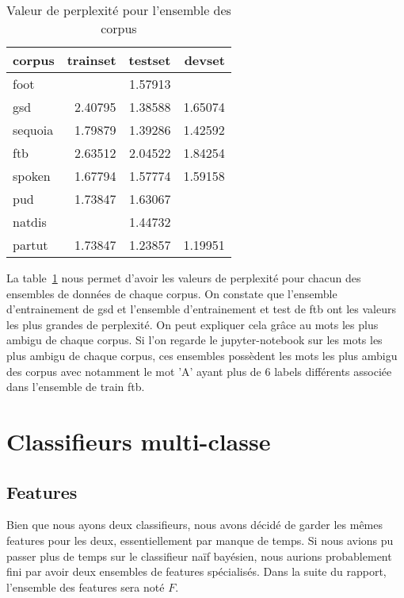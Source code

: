 \documentclass[french, 14pt]{memoir}
\begin{document}
\begin{table}
\begin{center}
\begin{tabular}{|l|r|r|r|}
\hline
corpus & trainset & testset & devset \\
\hline
 foot    &         & 1.57913 &         \\
 gsd     & 2.40795 & 1.38588 & 1.65074 \\
 sequoia & 1.79879 & 1.39286 & 1.42592 \\
 ftb     & 2.63512 & 2.04522 & 1.84254 \\
 spoken  & 1.67794 & 1.57774 & 1.59158 \\
 pud     & 1.73847 & 1.63067 &         \\
 natdis  &         & 1.44732 &         \\
 partut  & 1.73847 & 1.23857 & 1.19951 \\
\hline
\end{tabular}
\end{center}
\caption{Valeur de perplexité pour l'ensemble des corpus}
\label{perplexityTable}
\end{table}

La table~\ref{perplexityTable} nous permet d'avoir les valeurs de perplexité pour chacun des ensembles de données de chaque corpus. On constate que l'ensemble d'entrainement de gsd et l'ensemble d'entrainement et test de ftb ont les valeurs les plus grandes de perplexité. On peut expliquer cela grâce au mots les plus ambigu de chaque corpus. Si l'on regarde le jupyter-notebook sur les mots les plus ambigu de chaque corpus, ces ensembles possèdent les mots les plus ambigu des corpus avec notamment le mot 'A' ayant plus de 6 labels différents associée dans l'ensemble de train ftb.

\chapter{Classifieurs multi-classe}

\section{Features}

Bien que nous ayons deux classifieurs, nous avons décidé de garder les mêmes features pour les deux, essentiellement par manque de temps. Si nous avions pu passer plus de temps sur le classifieur naïf bayésien, nous aurions probablement fini par avoir deux ensembles de features spécialisés. Dans la suite du rapport, l'ensemble des features sera noté $F$.
\end{document}

